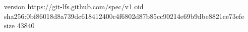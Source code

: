 version https://git-lfs.github.com/spec/v1
oid sha256:0bf86018d8a739dc618412400c4f6802d87b85cc90214e69b9dbe8821ce73efe
size 43840
